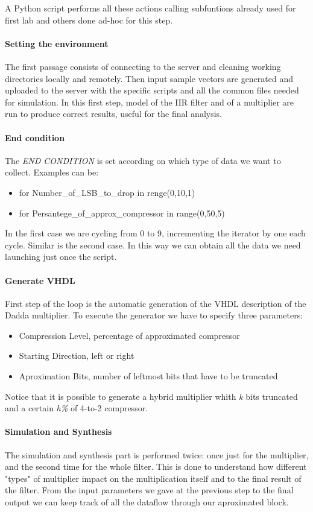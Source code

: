 \documentclass[a4paper]{article}
\begin{document}
	A Python script performs all these actions calling subfuntions already used for first lab and others done ad-hoc for this step.
	\paragraph{Setting the environment} The first passage consists of connecting to the server and cleaning working directories locally and remotely. Then input sample vectors are generated and uploaded to the server with the specific scripts and all the common files needed for simulation. In this first step, model of the IIR filter and of a multiplier are run to produce correct results, useful for the final analysis.

	\paragraph{End condition} The \textit{END CONDITION} is set according on which type of data we want to collect. Examples can be:
	\begin{itemize}
		\item for Number\_of\_LSB\_to\_drop in renge(0,10,1)
		\item for Persantege\_of\_approx\_compressor in range(0,50,5)
	\end{itemize}
	In the first case we are cycling from 0 to 9, incrementing the iterator by one each cycle. Similar is the second case.\newline
	In this way we can obtain all the data we need launching just once the script.

	\paragraph{Generate VHDL} First step of the loop is the automatic generation of the VHDL description of the Dadda multiplier. To execute the generator we have to specify three parameters:
	\begin{itemize}
		\item Compression Level, percentage of approximated compressor
		\item Starting Direction, left or right
		\item Aproximation Bits, number of leftmost bits that have to be truncated
	\end{itemize}
	Notice that it is possible to generate a hybrid multiplier whith \textit{k} bits truncated and a certain \textit{h\%} of 4-to-2 compressor.

	\paragraph{Simulation and Synthesis} The simulation and synthesis part is performed twice: once just for the multiplier, and the second time for the whole filter. This is done to understand how different "types" of multiplier impact on the multiplication itself and to the final result of the filter. From the input parameters we gave at the previous step to the final output we can keep track of all the dataflow through our aproximated block.
\end{document}

